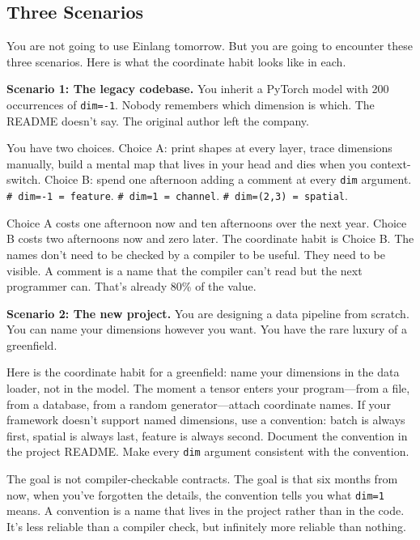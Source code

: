 \documentclass[11pt,titlepage]{article}
\begin{document}
\vspace{2em}

\hypertarget{three-scenarios}{%
\subsection{Three Scenarios}\label{three-scenarios}}

You are not going to use Einlang tomorrow. But you are going to
encounter these three scenarios. Here is what the coordinate habit looks
like in each.

\textbf{Scenario 1: The legacy codebase.} You inherit a PyTorch model
with 200 occurrences of \texttt{dim=-1}. Nobody remembers which
dimension is which. The README doesn't say. The original author left the
company.

You have two choices. Choice A: print shapes at every layer, trace
dimensions manually, build a mental map that lives in your head and dies
when you context-switch. Choice B: spend one afternoon adding a comment
at every \texttt{dim} argument. \texttt{\#\ dim=-1\ =\ feature}.
\texttt{\#\ dim=1\ =\ channel}. \texttt{\#\ dim=(2,3)\ =\ spatial}.

Choice A costs one afternoon now and ten afternoons over the next year.
Choice B costs two afternoons now and zero later. The coordinate habit
is Choice B. The names don't need to be checked by a compiler to be
useful. They need to be visible. A comment is a name that the compiler
can't read but the next programmer can. That's already 80\% of the
value.

\textbf{Scenario 2: The new project.} You are designing a data pipeline
from scratch. You can name your dimensions however you want. You have
the rare luxury of a greenfield.

Here is the coordinate habit for a greenfield: name your dimensions in
the data loader, not in the model. The moment a tensor enters your
program---from a file, from a database, from a random generator---attach
coordinate names. If your framework doesn't support named dimensions,
use a convention: batch is always first, spatial is always last, feature
is always second. Document the convention in the project README. Make
every \texttt{dim} argument consistent with the convention.

The goal is not compiler-checkable contracts. The goal is that six
months from now, when you've forgotten the details, the convention tells
you what \texttt{dim=1} means. A convention is a name that lives in the
project rather than in the code. It's less reliable than a compiler
check, but infinitely more reliable than nothing.
\end{document}
